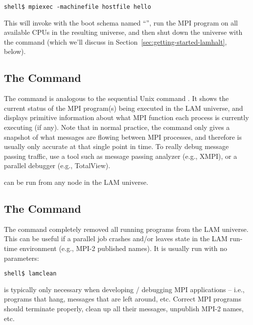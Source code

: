 \lstset{style=lam-cmdline}
\begin{lstlisting}
shell$ mpiexec -machinefile hostfile hello
\end{lstlisting}

This will invoke  with the boot schema named
``'', run the MPI program  on all available
CPUs in the resulting universe, and then shut down the universe with
the  command (which we'll discuss in
Section~\ref{sec:getting-started-lamhalt}, below).


\subsection{The  Command}

The  command is analogous to the sequential Unix command
.  It shows the current status of the MPI program(s) being
executed in the LAM universe, and displays primitive information about
what MPI function each process is currently executing (if any).  Note
that in normal practice, the  command only gives a
snapshot of what messages are flowing between MPI processes, and
therefore is usually only accurate at that single point in time.  To
really debug message passing traffic, use a tool such as message
passing analyzer (e.g., XMPI), or a parallel debugger (e.g.,
TotalView).

 can be run from any node in the LAM universe.


\subsection{The  Command}

The  command completely removed all running programs
from the LAM universe.  This can be useful if a parallel job crashes
and/or leaves state in the LAM run-time environment (e.g., MPI-2
published names).  It is usually run with no parameters:

\lstset{style=lam-cmdline}
\begin{lstlisting}
shell$ lamclean
\end{lstlisting}

 is typically only necessary when developing / debugging
MPI applications -- i.e., programs that hang, messages that are left
around, etc.  Correct MPI programs should terminate properly, clean up
all their messages, unpublish MPI-2 names, etc.

